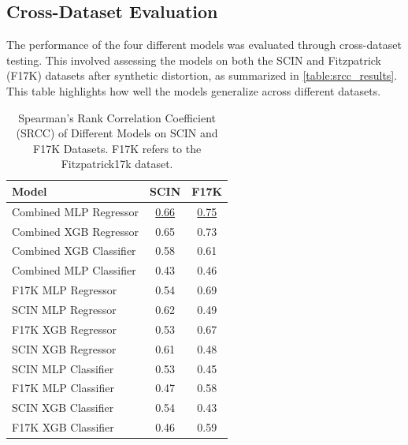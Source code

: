 \subsection{Cross-Dataset Evaluation}
\label{subsec:CrossDatasetEvaluation}
The performance of the four different models was evaluated through cross-dataset testing. This involved assessing the models on both the SCIN and Fitzpatrick (F17K) datasets after synthetic distortion, as summarized in \autoref{table:srcc_results}. This table highlights how well the models generalize across different datasets.\par 
 \begin{table}[ht]
    \centering
    \begin{tabular}{|l|c|c|}
        \hline
        \textbf{Model} & \textbf{SCIN} & \textbf{F17K} \\
        \hline
        Combined MLP Regressor & \underline{0.66} & \underline{0.75} \\
        Combined XGB Regressor & 0.65 & 0.73 \\
        Combined XGB Classifier & 0.58 & 0.61 \\
        Combined MLP Classifier & 0.43 & 0.46 \\
        \hline
        F17K MLP Regressor & 0.54 & 0.69 \\
        SCIN MLP Regressor & 0.62 & 0.49 \\
        F17K XGB Regressor & 0.53 & 0.67 \\
        SCIN XGB Regressor & 0.61 & 0.48 \\
        SCIN MLP Classifier & 0.53 & 0.45 \\
        F17K MLP Classifier & 0.47 & 0.58 \\
        SCIN XGB Classifier & 0.54 & 0.43 \\
        F17K XGB Classifier & 0.46 & 0.59 \\
        \hline
    \end{tabular}
    \caption{Spearman’s Rank Correlation Coefficient (SRCC) of Different Models on SCIN and F17K Datasets. F17K refers to the Fitzpatrick17k dataset.}
    \label{table:srcc_results}
\end{table}
